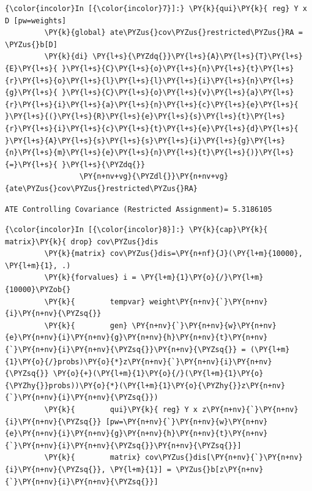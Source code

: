\documentclass[11pt,notitlepage]{article}\usepackage[]{graphicx}\usepackage[]{color}
\makeatletter
\newenvironment{kframe}{%
 \def\at@end@of@kframe{}%
 \ifinner\ifhmode%
  \def\at@end@of@kframe{\end{minipage}}%
  \begin{minipage}{\columnwidth}%
 \fi\fi%
 \def\FrameCommand##1{\hskip\@totalleftmargin \hskip-\fboxsep
 \colorbox{shadecolor}{##1}\hskip-\fboxsep
     \hskip-\linewidth \hskip-\@totalleftmargin \hskip\columnwidth}%
 \MakeFramed {\advance\hsize-\width
   \@totalleftmargin\z@ \linewidth\hsize
   \@setminipage}}%
 {\par\unskip\endMakeFramed%
 \at@end@of@kframe}
\newenvironment{knitrout}{}{} %
\makeatother
\begin{document}
\begin{enumerate}[a)]
\begin{knitrout}
\color{fgcolor}\begin{kframe}
    \begin{Verbatim}[commandchars=\\\{\}]
{\color{incolor}In [{\color{incolor}7}]:} \PY{k}{qui}\PY{k}{ reg} Y x D [pw=weights]
         \PY{k}{global} ate\PYZus{}cov\PYZus{}restricted\PYZus{}RA = \PYZus{}b[D]
         \PY{k}{di} \PY{l+s}{\PYZdq{}}\PY{l+s}{A}\PY{l+s}{T}\PY{l+s}{E}\PY{l+s}{ }\PY{l+s}{C}\PY{l+s}{o}\PY{l+s}{n}\PY{l+s}{t}\PY{l+s}{r}\PY{l+s}{o}\PY{l+s}{l}\PY{l+s}{l}\PY{l+s}{i}\PY{l+s}{n}\PY{l+s}{g}\PY{l+s}{ }\PY{l+s}{C}\PY{l+s}{o}\PY{l+s}{v}\PY{l+s}{a}\PY{l+s}{r}\PY{l+s}{i}\PY{l+s}{a}\PY{l+s}{n}\PY{l+s}{c}\PY{l+s}{e}\PY{l+s}{ }\PY{l+s}{(}\PY{l+s}{R}\PY{l+s}{e}\PY{l+s}{s}\PY{l+s}{t}\PY{l+s}{r}\PY{l+s}{i}\PY{l+s}{c}\PY{l+s}{t}\PY{l+s}{e}\PY{l+s}{d}\PY{l+s}{ }\PY{l+s}{A}\PY{l+s}{s}\PY{l+s}{s}\PY{l+s}{i}\PY{l+s}{g}\PY{l+s}{n}\PY{l+s}{m}\PY{l+s}{e}\PY{l+s}{n}\PY{l+s}{t}\PY{l+s}{)}\PY{l+s}{=}\PY{l+s}{ }\PY{l+s}{\PYZdq{}} 
        		 \PY{n+nv+vg}{\PYZdl{}}\PY{n+nv+vg}{ate\PYZus{}cov\PYZus{}restricted\PYZus{}RA}
\end{Verbatim}

    \begin{Verbatim}[commandchars=\\\{\}]
ATE Controlling Covariance (Restricted Assignment)= 5.3186105
    \end{Verbatim}

    \begin{Verbatim}[commandchars=\\\{\}]
{\color{incolor}In [{\color{incolor}8}]:} \PY{k}{cap}\PY{k}{ matrix}\PY{k}{ drop} cov\PYZus{}dis
         \PY{k}{matrix} cov\PYZus{}dis=\PY{n+nf}{J}(\PY{l+m}{10000}, \PY{l+m}{1}, .)        
         \PY{k}{forvalues} i = \PY{l+m}{1}\PY{o}{/}\PY{l+m}{10000}\PYZob{}
         \PY{k}{		tempvar} weight\PY{n+nv}{`}\PY{n+nv}{i}\PY{n+nv}{\PYZsq{}}
         \PY{k}{		gen} \PY{n+nv}{`}\PY{n+nv}{w}\PY{n+nv}{e}\PY{n+nv}{i}\PY{n+nv}{g}\PY{n+nv}{h}\PY{n+nv}{t}\PY{n+nv}{`}\PY{n+nv}{i}\PY{n+nv}{\PYZsq{}}\PY{n+nv}{\PYZsq{}} = (\PY{l+m}{1}\PY{o}{/}probs)\PY{o}{*}z\PY{n+nv}{`}\PY{n+nv}{i}\PY{n+nv}{\PYZsq{}} \PY{o}{+}(\PY{l+m}{1}\PY{o}{/}(\PY{l+m}{1}\PY{o}{\PYZhy{}}probs))\PY{o}{*}(\PY{l+m}{1}\PY{o}{\PYZhy{}}z\PY{n+nv}{`}\PY{n+nv}{i}\PY{n+nv}{\PYZsq{}})
         \PY{k}{		qui}\PY{k}{ reg} Y x z\PY{n+nv}{`}\PY{n+nv}{i}\PY{n+nv}{\PYZsq{}} [pw=\PY{n+nv}{`}\PY{n+nv}{w}\PY{n+nv}{e}\PY{n+nv}{i}\PY{n+nv}{g}\PY{n+nv}{h}\PY{n+nv}{t}\PY{n+nv}{`}\PY{n+nv}{i}\PY{n+nv}{\PYZsq{}}\PY{n+nv}{\PYZsq{}}]		
         \PY{k}{		matrix} cov\PYZus{}dis[\PY{n+nv}{`}\PY{n+nv}{i}\PY{n+nv}{\PYZsq{}}, \PY{l+m}{1}] = \PYZus{}b[z\PY{n+nv}{`}\PY{n+nv}{i}\PY{n+nv}{\PYZsq{}}]
         

\end{Verbatim}
\end{kframe}
\end{knitrout}
\end{enumerate}
\end{document}
